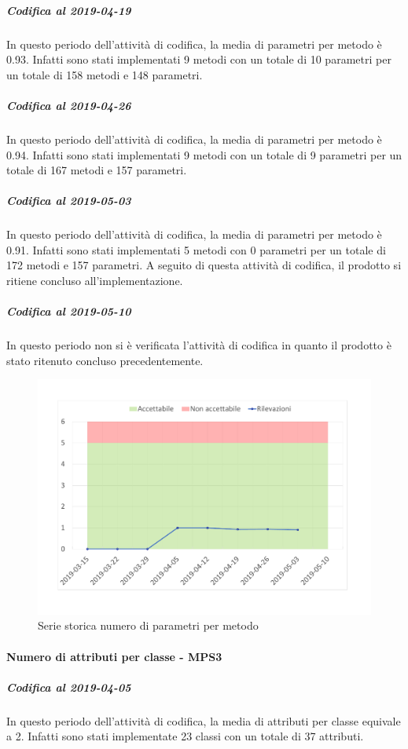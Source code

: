 \subparagraph{Codifica al 2019-04-19}
In questo periodo dell'attività di codifica, la media di parametri per metodo è 0.93. Infatti sono stati implementati 9 metodi con un totale di 10 parametri per un totale di 158 metodi e 148 parametri.

\subparagraph{Codifica al 2019-04-26}
In questo periodo dell'attività di codifica, la media di parametri per metodo è 0.94. Infatti sono stati implementati 9 metodi con un totale di 9 parametri per un totale di 167 metodi e 157 parametri.

\subparagraph{Codifica al 2019-05-03}
In questo periodo dell'attività di codifica, la media di parametri per metodo è 0.91. Infatti sono stati implementati 5 metodi con  0 parametri per un totale di 172 metodi e 157 parametri. 
A seguito di questa attività di codifica, il prodotto si ritiene concluso all'implementazione.

\subparagraph{Codifica al 2019-05-10}
In questo periodo non si è verificata l'attività di codifica in quanto il prodotto è stato ritenuto concluso precedentemente.
\\
\begin{figure}[H]
	\centering
	\includegraphics[scale=0.6]{images/resoconto/MPS2Chart.pdf}
	\caption{Serie storica numero di parametri per metodo}	
\end{figure}

\paragraph{Numero di attributi per classe - MPS3}
\subparagraph{Codifica al 2019-04-05}
In questo periodo dell'attività di codifica, la media di attributi per classe equivale a 2. Infatti sono stati implementate 23 classi con un totale di 37 attributi.

